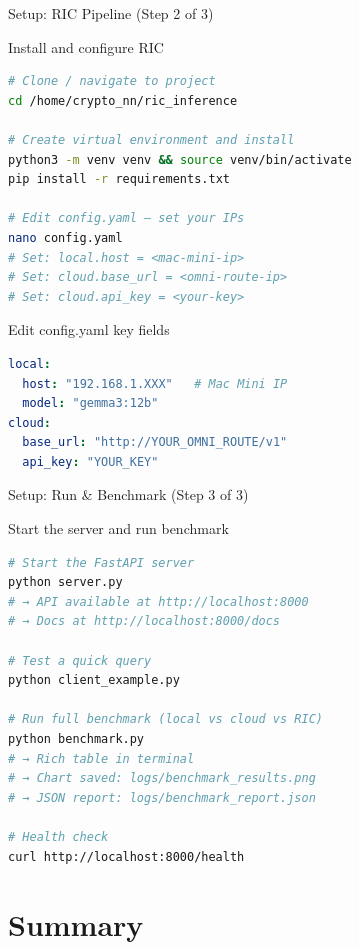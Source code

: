\documentclass[aspectratio=169]{beamer}
\begin{document}
\begin{frame}[fragile]{Setup: RIC Pipeline (Step 2 of 3)}
\begin{block}{Install and configure RIC}
\begin{lstlisting}[language=bash]
# Clone / navigate to project
cd /home/crypto_nn/ric_inference

# Create virtual environment and install
python3 -m venv venv && source venv/bin/activate
pip install -r requirements.txt

# Edit config.yaml — set your IPs
nano config.yaml
# Set: local.host = <mac-mini-ip>
# Set: cloud.base_url = <omni-route-ip>
# Set: cloud.api_key = <your-key>
\end{lstlisting}
\end{block}
\begin{block}{Edit config.yaml key fields}
\begin{lstlisting}[language=yaml]
local:
  host: "192.168.1.XXX"   # Mac Mini IP
  model: "gemma3:12b"
cloud:
  base_url: "http://YOUR_OMNI_ROUTE/v1"
  api_key: "YOUR_KEY"
\end{lstlisting}
\end{block}
\end{frame}

\begin{frame}[fragile]{Setup: Run \& Benchmark (Step 3 of 3)}
\begin{block}{Start the server and run benchmark}
\begin{lstlisting}[language=bash]
# Start the FastAPI server
python server.py
# → API available at http://localhost:8000
# → Docs at http://localhost:8000/docs

# Test a quick query
python client_example.py

# Run full benchmark (local vs cloud vs RIC)
python benchmark.py
# → Rich table in terminal
# → Chart saved: logs/benchmark_results.png
# → JSON report: logs/benchmark_report.json

# Health check
curl http://localhost:8000/health
\end{lstlisting}
\end{block}
\end{frame}

\section{Summary}
\end{document}
